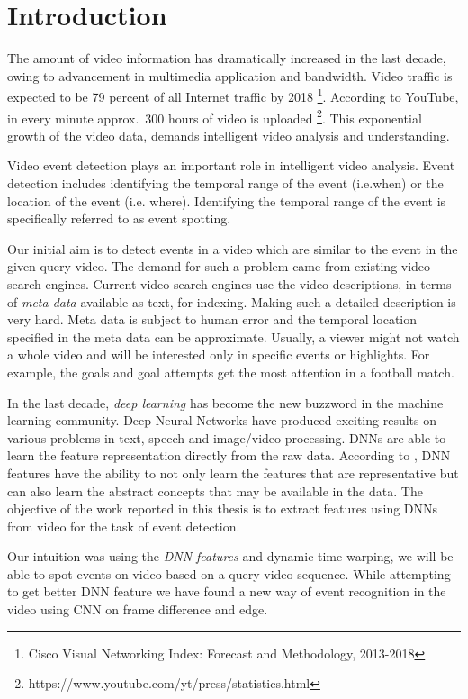 \chapter{Introduction}
\label{chap:intro}

The amount of video information has dramatically increased in the last decade, owing to advancement in multimedia application and bandwidth.  Video traffic is expected to be  79 percent of all Internet traffic by 2018 \footnote{Cisco Visual Networking Index: Forecast and Methodology, 2013-2018}.  According to YouTube, in every minute approx.~300 hours of video is uploaded \footnote{https://www.youtube.com/yt/press/statistics.html}.  This exponential growth of the video data, demands intelligent video analysis and understanding.

Video event detection plays an important role in intelligent video analysis.  Event detection includes identifying the temporal range of the event (i.e.when) or the location of the event (i.e.  where).  Identifying the temporal range of the event is specifically referred to as event spotting. 

Our initial aim is to detect events in a video which are similar to the event in the given query video.  The demand for such a problem came from existing video search engines.  Current video search engines use the video descriptions, in terms of  \textit{meta data} available as text, for indexing.  Making such a detailed description is very hard.  Meta data is subject to human error and the temporal location specified in the meta data can be approximate.  Usually, a viewer might not watch a whole video and will be interested only in specific events or highlights.  For example, the goals and goal attempts get the most attention in a football match.

In the last decade, \textit{deep learning} has become the new buzzword in the machine learning community.  Deep Neural Networks have produced exciting results on various problems in text, speech and image/video processing.  DNNs are able to learn the feature representation directly from the raw data.  According to \citet{hinton2009deep}, DNN features have the ability to not only learn the features that are representative but can also learn the abstract concepts that may be available in the data.   The objective of the work reported in this thesis is to extract features using DNNs from video for the task of event detection.

Our intuition was using the \textit{DNN features} and dynamic time warping, we will be able to spot events on video based on a query video sequence.  While attempting  to get better DNN feature we have found a new  way of event recognition in the video using CNN on frame difference and edge.

